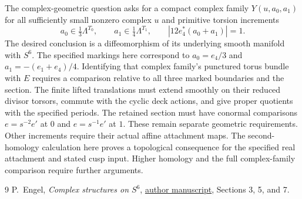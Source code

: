 The complex-geometric question asks for a compact complex family $Y(u,a_0,a_1)$
for all sufficiently small nonzero complex $u$ and primitive torsion increments
\[
a_0\in\tfrac13\Lambda^{T_0},\qquad a_1\in\tfrac14\Lambda^{T_1},\qquad
|12e_4^*(a_0+a_1)|=1.
\]
The desired conclusion is a diffeomorphism of its underlying smooth manifold with $S^6$.
The specified markings here correspond to
$a_0=e_4/3$ and $a_1=-(e_1+e_4)/4$.
Identifying that complex family's punctured torus bundle with $E$ requires
a comparison relative to all three marked boundaries and the section.
The finite lifted translations must extend smoothly on their reduced divisor torsors,
commute with the cyclic deck actions, and give proper quotients with the specified periods.
The retained section must have conormal comparisons $e=s^{-2}e'$ at $0$
and $e=s^{-1}e'$ at $1$.
These remain separate geometric requirements.
Other increments require their actual affine attachment maps.
The second-homology calculation here proves a topological consequence for
the specified real attachment and stated cusp input.
Higher homology and the full complex-family comparison require further arguments.

\begin{thebibliography}{9}
 P.~Engel, \emph{Complex structures on $S^6$},
\href{https://philip-engel.github.io/S6.pdf}{author manuscript},
Sections 3, 5, and 7.
\end{thebibliography}
